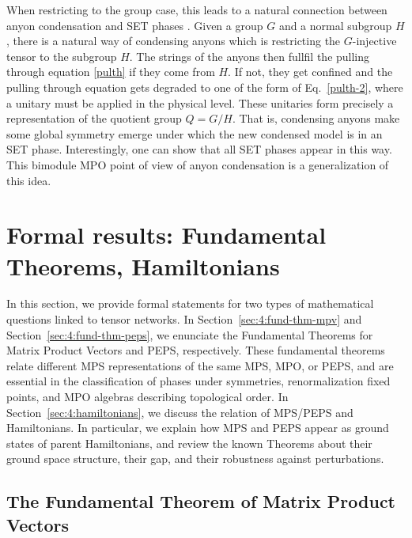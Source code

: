 \documentclass[rmp,aps,reprint,superscriptaddress,nobalancelastpage]{revtex4-1}
\begin{document}
    When restricting to the group case, this leads to a natural connection between anyon condensation and SET phases  \cite{garre2017symmetry}. Given a group $G$ and a normal subgroup $H$, there is a natural way of condensing anyons which is restricting the $G$-injective tensor to the subgroup $H$. The strings of the anyons then fullfil the pulling through equation \eqref{pulth} if they come from $H$. If not, they get confined and the pulling through equation gets degraded to one of the form of Eq.~\eqref{pulth-2}, where a unitary must be applied in the physical level. These unitaries form precisely a representation of the quotient group $Q=G/H$. That is, condensing anyons make some global symmetry emerge under which the new condensed model is in an SET phase. Interestingly, one can show that all SET phases appear in this way. This bimodule MPO point of view of anyon condensation is a generalization of this idea.






    \section{Formal results: Fundamental Theorems, Hamiltonians%
      \label{sec_4}\label{sec:4}}



    In this section, we provide formal statements for two types of mathematical questions linked to tensor networks.  In Section~\ref{sec:4:fund-thm-mpv} and Section~\ref{sec:4:fund-thm-peps}, we enunciate the Fundamental Theorems for Matrix Product Vectors and PEPS, respectively. These fundamental theorems relate different MPS representations of the same MPS, MPO, or PEPS, and are essential in the classification of phases under symmetries, renormalization fixed points, and MPO algebras describing topological order.  In Section~\ref{sec:4:hamiltonians}, we discuss the relation of MPS/PEPS and Hamiltonians. In particular, we explain how MPS and PEPS appear as ground states of parent Hamiltonians, and review the known Theorems about their ground space structure, their gap, and their robustness against perturbations.






    \subsection{The Fundamental Theorem of Matrix Product Vectors\label{Sec:MPV}\label{sec:4:fund-thm-mpv}}
\end{document}
